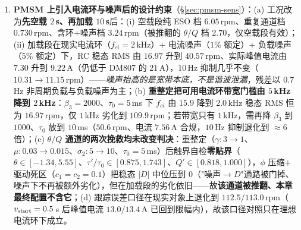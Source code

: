 \documentclass[11pt]{article}
\theoremstyle{remark}\newtheorem{remark}{注}
\begin{document}
\begin{enumerate}
  \item \textbf{PMSM 上引入电流环与噪声后的设计约束}（\S\ref{sec:pmsm-sens}）：(a) 工况改为\textbf{先空载 $2$\,s、再加载 $10$\,s}后：(i) 空载段纯 ESO 档 $6.05$\,rpm、重复通道档 $0.730$\,rpm、含环+噪声档 $3.24$\,rpm（被推翻的 $\theta/Q$ 档 $2.70$，仅空载段有效）；(ii) 加载段在现实电流环（$f_{ci}=2$\,kHz）$+$ 电流噪声（$1\%$ 额定）$+$ 负载噪声（$5\%$ 额定）下，RC 稳态 RMS 由 $16.97$ 升到 $40.57$\,rpm、实际峰值电流由 $7.30$ 升到 $9.22$\,A（仍低于 DM807 的 $21$\,A），$10$\,Hz 抑制几乎不变（$10.31\to11.15$\,rpm）——\emph{噪声抬高的是宽带本底，不是谐波泄漏}，残差以 $0.7$\,Hz 非周期负载与负载噪声为主；(b) \textbf{重整定把可用电流环带宽门槛由 $5$\,kHz 降到 $2$\,kHz}：$\beta_3=2000$、$\tau_0=5$\,ms 下 $f_{ci}$ 由 $15.9$ 降到 $2.0$\,kHz 稳态 RMS 恒为 $16.97$\,rpm，仅 $1$\,kHz 劣化到 $109.9$\,rpm；若带宽只有 $1$\,kHz，需再降 $\beta_3$ 到 $1000$、$\tau_0$ 放到 $10$\,ms（$50.6$\,rpm、电流 $7.56$\,A 合规，$10$\,Hz 抑制退化到 $\approx6$ 倍）；(c) \textbf{$\theta/Q$ 通道的两次挽救均未改变判决}：重整定（$\gamma:3\to1$、$\mu:0.03\to0.015$、$\sigma_2:5\to10$、$\tau_0=5$\,ms）后触界自检\textbf{零贴界}（$\theta\in[-1.34,5.55]$、$\tau'/\tau_0\in[0.875,1.743]$、$Q'\in[0.818,1.000]$），$\phi$ 压缩$+$驱动死区（$c_1=c_2=0.1$）把稳态 $|D|$ 中位压到 $0$（"噪声$\to D$"通路被门掉、噪声下不再被额外劣化），但在加载段的劣化依旧——故\textbf{该通道被推翻、本章最终配置不含它}；(d) 跟踪误差口径在现实对象上退化到 $112.5/113.0$\,rpm（$v_{\rm start}=0.5$\,s 后峰值电流 $13.0/13.4$\,A 已回到限幅内），故该口径对照只在理想电流环下成立。
\end{enumerate}
\end{document}
